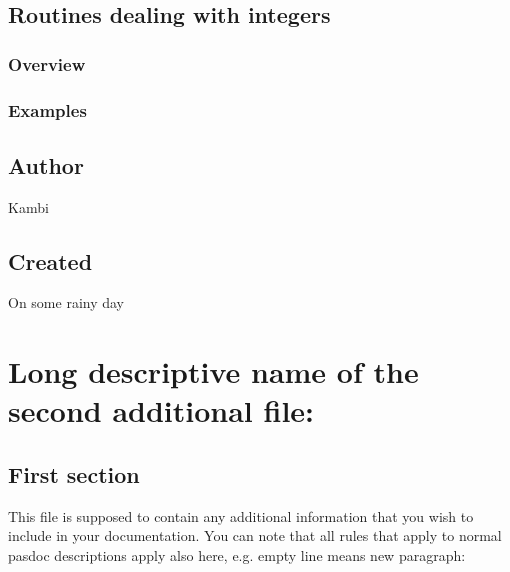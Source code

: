 \documentclass{report}
\newif\ifpdf
\begin{document}
\section{Routines dealing with integers}


\label{SecIntegersOverview}
\ifpdf
\subsection*{\large{\textbf{Overview}}\normalsize\hspace{1ex}\hrulefill}\else
\subsection*{Overview}
\fi


\label{SecIntegersExamples}
\ifpdf
\subsection*{\large{\textbf{Examples}}\normalsize\hspace{1ex}\hrulefill}\else
\subsection*{Examples}
\fi
\section{Author}
\par
Kambi

\section{Created}
\par
On some rainy day


\chapter{Long descriptive name of the second additional file:}
\label{ok_additionalfile2}
 

 

\label{SecFirst}
\section{First section}


This file is supposed to contain any additional information that you wish to include in your documentation. You can note that all rules that apply to normal pasdoc descriptions apply also here, e.g. empty line means new paragraph:
\end{document}
